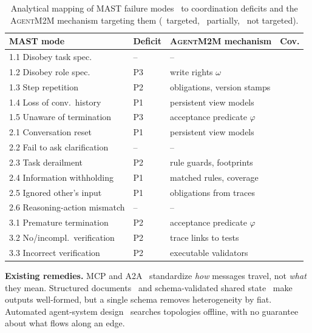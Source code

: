 \documentclass[10pt,conference]{IEEEtran}
\newcommand{\cmark}{\ding{51}}
\newcommand{\xmark}{\ding{55}}
\newcommand{\pmark}{\ding{109}} %
\theoremstyle{definition}
\newcommand{\tool}{\textsc{AgentM2M}}
\begin{document}
\begin{table}[t]
\centering
\caption{Analytical mapping of MAST failure modes~\cite{cemri2025mast} to
coordination deficits and the \tool{} mechanism targeting them
(\cmark\ targeted, \pmark\ partially, \xmark\ not targeted).}
\label{tab:mast}
\footnotesize
\setlength{\tabcolsep}{3pt}
\begin{tabular}{@{}l l l c@{}}
\toprule
MAST mode & Deficit & \tool{} mechanism & Cov. \\
\midrule
1.1 Disobey task spec.        & --  & -- & \xmark \\
1.2 Disobey role spec.        & P3  & write rights $\omega$ & \pmark \\
1.3 Step repetition           & P2  & obligations, version stamps & \pmark \\
1.4 Loss of conv.\ history    & P1  & persistent view models & \cmark \\
1.5 Unaware of termination    & P3  & acceptance predicate $\varphi$ & \pmark \\
2.1 Conversation reset        & P1  & persistent view models & \cmark \\
2.2 Fail to ask clarification & --  & -- & \xmark \\
2.3 Task derailment           & P2  & rule guards, footprints & \pmark \\
2.4 Information withholding   & P1  & matched rules, coverage & \cmark \\
2.5 Ignored other's input     & P1  & obligations from traces & \cmark \\
2.6 Reasoning-action mismatch & --  & -- & \xmark \\
3.1 Premature termination     & P2  & acceptance predicate $\varphi$ & \pmark \\
3.2 No/incompl.\ verification & P2 & trace links to tests & \cmark \\
3.3 Incorrect verification    & P2  & executable validators & \pmark \\
\bottomrule
\end{tabular}
\end{table}

\smallskip\noindent\textbf{Existing remedies.} MCP and A2A~\cite{mcp2024,a2a2025}
standardize \emph{how} messages travel, not \emph{what} they mean. Structured documents~\cite{hong2024metagpt} and
schema-validated shared state~\cite{zhang2026patchboard} make outputs
well-formed, but a single schema removes heterogeneity by fiat. Automated
agent-system design~\cite{zhuge2024gptswarm,hu2025adas,zhang2025aflow}
searches topologies offline, with no guarantee about what flows along an
edge.
\end{document}
